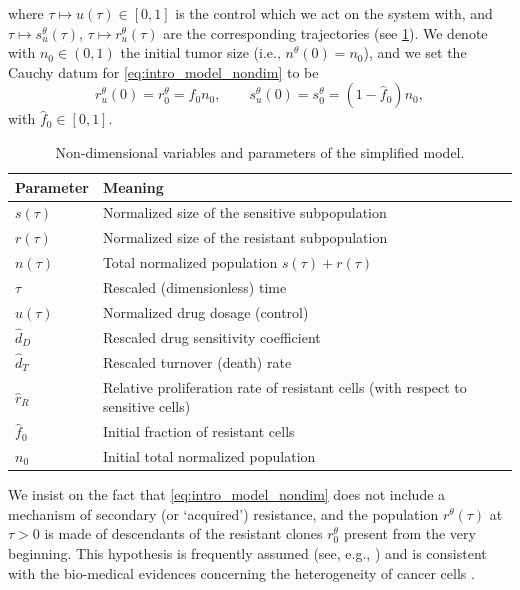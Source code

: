 \documentclass[a4paper,12pt, reqno]{amsart}
\theoremstyle{plain}
\theoremstyle{definition}
\theoremstyle{remark}
\numberwithin{equation}{section}
\begin{document}
{\begin{equation}
\end{equation}
where $\tau\mapsto u(\tau) \in [0,1]$ is the control which we act on the system with, and $\tau \mapsto s^\theta_u(\tau)$, $\tau \mapsto r^\theta_u(\tau)$ are the corresponding trajectories (see \cref{tab:nondim_parameters}). We denote with $n_0\in (0,1)$ the initial tumor size (i.e., $n^\theta(0)=n_0$), and we set the Cauchy datum for \eqref{eq:intro_model_nondim} to be
\begin{equation} \label{eq:intro_Cauchy}
    r^\theta_u(0) = r_0^\theta = \hat f_0n_0, \qquad s^\theta_u(0) = s_0^\theta =(1-\hat f_0)n_0, 
\end{equation}
with $\hat f_0 \in [0,1]$.
\begin{table}[ht]
\centering
\begin{tabular}{ll}
\toprule
\textbf{Parameter} & \textbf{Meaning} \\
\midrule
$s(\tau)$ & Normalized size of the sensitive subpopulation \\
$r(\tau)$ & Normalized size of the resistant subpopulation \\
$n(\tau)$ & Total normalized population $s(\tau)+r(\tau)$ \\
$\tau$ & Rescaled (dimensionless) time \\
$u(\tau)$ & Normalized drug dosage (control) \\
$\hat d_D$ & Rescaled drug sensitivity coefficient \\
$\hat d_T$ & Rescaled turnover (death) rate \\
$\hat r_R$ & Relative proliferation rate of resistant cells (with respect to sensitive cells) \\
$\hat f_0$ & Initial fraction of resistant cells \\
$n_0$ & Initial total normalized population \\
\bottomrule
\end{tabular}
\caption{Non-dimensional variables and parameters of the simplified model.}
\label{tab:nondim_parameters}
\end{table}
We insist on the fact that \cref{eq:intro_model_nondim} does not include a mechanism of secondary (or `acquired') resistance, and the population $r^\theta(\tau)$ at $\tau>0$ is made of descendants of the resistant clones $r_0^\theta$ present from the very beginning. This hypothesis is frequently assumed (see, e.g., \cite{cunningham2018optimal,turnover2021}) and is consistent with the bio-medical evidences concerning the heterogeneity of cancer cells \cite{swanton2012heterogeneity}. }
\end{document}
